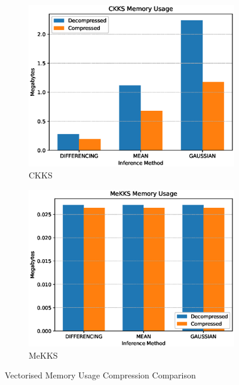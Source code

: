 \begin{figure}[h!]
    \centering
    \begin{subfigure}[b]{0.495\textwidth}
        \centering
        \includegraphics[width=\textwidth]{figures/memUsageCKKS}
        \caption{CKKS}
    \end{subfigure}
    \hfill
    \begin{subfigure}[b]{0.495\textwidth}
        \centering
        \includegraphics[width=\textwidth]{figures/memUsageMeKKS}
        \caption{MeKKS}
    \end{subfigure}
    \caption{Vectorised Memory Usage Compression Comparison}
    \label{fig:compression2}
\end{figure}
